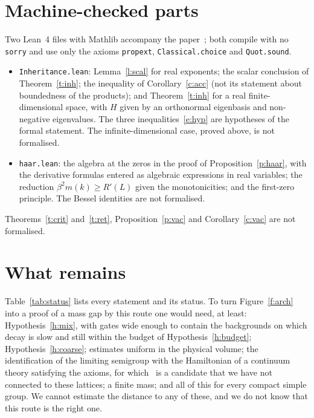 \section{Machine-checked parts}\label{s:lean}
Two Lean~4 files with Mathlib accompany the paper~\cite{RepoLean}; both compile with no \texttt{sorry} and use
only the axioms \texttt{propext}, \texttt{Classical.choice} and \texttt{Quot.sound}.
\begin{itemize}
\item \texttt{Inheritance.lean}: Lemma~\ref{l:scal} for real exponents; the scalar conclusion of
Theorem~\ref{t:inh}; the inequality of Corollary~\ref{c:acc} (not its statement about boundedness of the
products); and Theorem~\ref{t:inh} for a real finite-dimensional space, with $H$ given by an orthonormal
eigenbasis and non-negative eigenvalues. The three inequalities~\eqref{e:hyp} are hypotheses of the formal
statement. The infinite-dimensional case, proved above, is not formalised.
\item \texttt{haar.lean}: the algebra at the zeros in the proof of Proposition~\ref{p:haar}, with the
derivative formulas entered as algebraic expressions in real variables; the reduction
$\beta^2m(k)\ge R'(L)$ given the monotonicities; and the first-zero principle. The Bessel identities are not
formalised.
\end{itemize}
Theorems~\ref{t:crit} and~\ref{t:ret}, Proposition~\ref{p:vac} and Corollary~\ref{c:vac} are not formalised.

\section{What remains}\label{s:rem}
Table~\ref{tab:status} lists every statement and its status. To turn Figure~\ref{f:arch} into a proof of a
mass gap by this route one would need, at least: Hypothesis~\ref{h:mix}, with gates wide enough to contain the
backgrounds on which decay is slow and still within the budget of Hypothesis~\ref{h:budget};
Hypothesis~\ref{h:coarse}; estimates uniform in the physical volume; the identification of the limiting
semigroup with the Hamiltonian of a continuum theory satisfying the axioms, for which~\cite{OAI} is a
candidate that we have not connected to these lattices; a finite mass; and all of this for every compact
simple group. We cannot estimate the distance to any of these, and we do not know that this route is the
right one.


